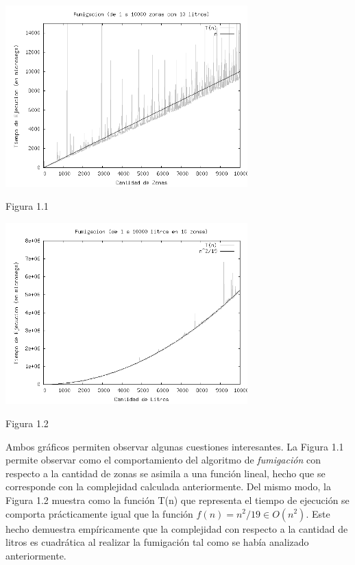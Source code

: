\documentclass[a4paper,11pt] {article}
\begin{document}
\begin{center}
 \includegraphics[width=0.7\textwidth]{Plots/Tp2Ej1-TiemposFumigacionPorZonas-10litros-bw.png}
\begin{center}
Figura 1.1
\end{center}
 \includegraphics[width=0.7\textwidth]{Plots/Tp2Ej1-TiemposFumigacionPorLitros-10zonas-bw.png}
\begin{center}
Figura 1.2
\end{center}
\end{center}

Ambos gráficos permiten observar algunas cuestiones interesantes. La Figura 1.1 permite observar como el comportamiento del algoritmo de \textit{fumigación} con respecto a la cantidad de zonas se asimila a una función lineal, hecho que se corresponde con la complejidad calculada anteriormente. Del mismo modo, la Figura 1.2 muestra como la función T(n) que representa el tiempo de ejecución se comporta prácticamente igual que la función $f(n) = n^2/19 \in O(n^2)$. Este hecho demuestra empíricamente que la complejidad con respecto a la cantidad de litros es cuadrática al realizar la fumigación tal como se había analizado anteriormente.
\end{document}
